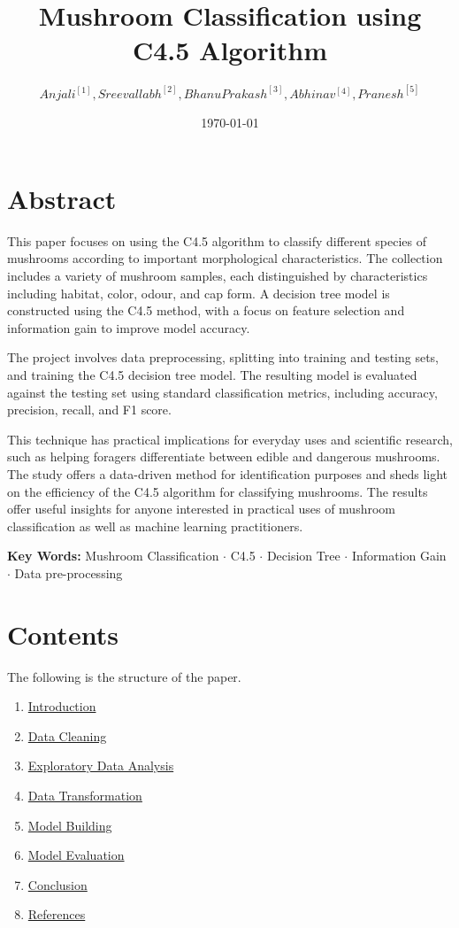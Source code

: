 \documentclass{article}
\title{\textbf{Mushroom Classification using C4.5 Algorithm}}
\author{$
Anjali^{[\hyperref[author:anjali]{1}]}, 
Sreevallabh^{[\hyperref[author:sreevallabh]{2}]}, 
Bhanu Prakash^{[\hyperref[author:bhanu]{3}]}, 
Abhinav^{[\hyperref[author:abhinav]{4}]}, 
Pranesh^{[\hyperref[author:pranesh]{5}]}$}
\date{\today}
\begin{document}
\maketitle

\section{Abstract}
This paper focuses on using the C4.5 algorithm to classify different species of mushrooms according to important morphological characteristics. The collection includes a variety of mushroom samples, each distinguished by characteristics including habitat, color, odour, and cap form. A decision tree model is constructed using the C4.5 method, with a focus on feature selection and information gain to improve model accuracy.

The project involves data preprocessing, splitting into training and testing sets, and training the C4.5 decision tree model. The resulting model is evaluated against the testing set using standard classification metrics, including accuracy, precision, recall, and F1 score.

This technique has practical implications for everyday uses and scientific research, such as helping foragers differentiate between edible and dangerous mushrooms. The study offers a data-driven method for identification purposes and sheds light on the efficiency of the C4.5 algorithm for classifying mushrooms. The results offer useful insights for anyone interested in practical uses of mushroom classification as well as machine learning practitioners.

\vspace{.25cm}
\setlength{\leftskip}{-.5cm}
\textbf{Key Words:} Mushroom Classification $\cdot$ C4.5 $\cdot$ Decision Tree $\cdot$ Information Gain $\cdot$ Data pre-processing

\section{Contents}\label{sec:contents}

The following is the structure of the paper.
\begin{enumerate}
    \item \hyperref[sec:intro]{Introduction}
    \item \hyperref[sec:dc]{Data Cleaning}
    \item \hyperref[sec:eda]{Exploratory Data Analysis}
    \item \hyperref[sec:transfromation]{Data Transformation}
    \item \hyperref[sec:building]{Model Building}
    \item \hyperref[sec:eval]{Model Evaluation}
    \item \hyperref[sec:conclusion]{Conclusion}
    \item \hyperref[sec:references]{References}
\end{enumerate}
\end{document}
